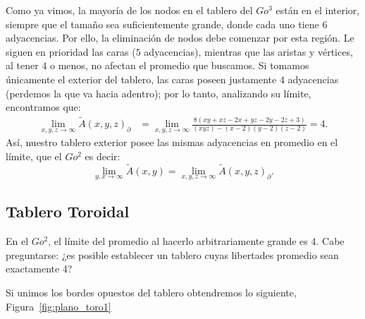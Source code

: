Como ya vimos, la mayoría de los nodos en el tablero del $Go^{3}$ están en el interior, siempre que el tamaño sea suficientemente grande, donde cada uno tiene $6$ adyacencias. Por ello, la eliminación de nodos debe comenzar por esta región. Le siguen en prioridad las caras ($5$ adyacencias), mientras que las aristas y vértices, al tener $4$ o menos, no afectan el promedio que buscamos. Si tomamos únicamente el exterior del tablero, las caras poseen justamente $4$ adyacencias (perdemos la que va hacia adentro); por lo tanto, analizando su límite, encontramos que:
\begin{align*}
	\lim_{x,y,z\to\infty} \tilde{A}(x,y,z)_{\partial}&=
	\lim_{x,y,z\to\infty}\frac{8 (x y + x z - 2 x + y z - 2 y - 2 z + 3)}{(xyz)-(x-2)(y-2)(z-2)}=4.
\end{align*}
Así, nuestro tablero exterior posee las mismas adyacencias en promedio en el límite, que el $Go^{2}$ es decir: $$\lim_{y,x\to\infty}  \tilde{A}(x,y)= \lim_{x,y,z\to\infty} \tilde{A}(x,y,z)_{\partial}.$$


\subsection{Tablero Toroidal}
\label{key:sectoro}
En el $Go^{2}$, el límite del promedio al hacerlo arbitrariamente grande es 4. Cabe preguntarse: ¿es posible establecer un tablero cuyas libertades promedio sean exactamente 4?

Si unimos los bordes opuestos del tablero obtendremos lo siguiente, Figura~\ref{fig:plano_toro1}

